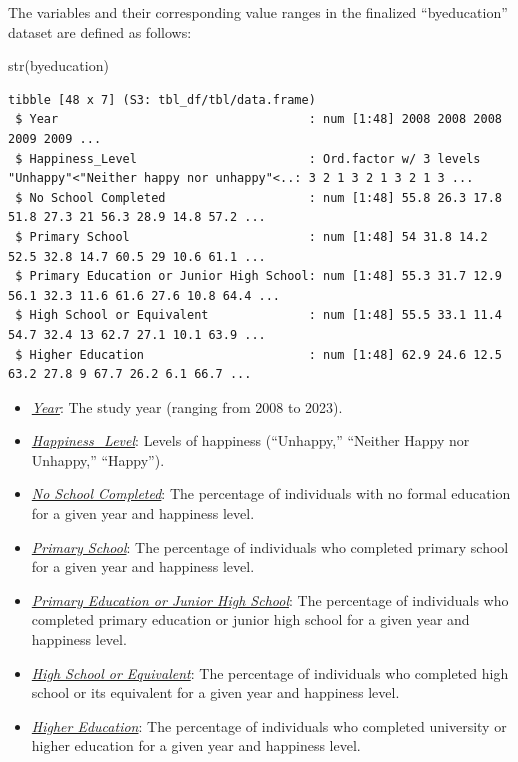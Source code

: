 \documentclass[
  11pt,
  a4paper,
  DIV=11,
  numbers=noendperiod]{scrartcl}
\newenvironment{Shaded}{\begin{snugshade}}{\end{snugshade}}
\newcommand{\FunctionTok}[1]{\textcolor[rgb]{0.28,0.35,0.67}{#1}}
\newcommand{\NormalTok}[1]{\textcolor[rgb]{0.00,0.23,0.31}{#1}}
\begin{document}
The variables and their corresponding value ranges in the finalized
``byeducation'' dataset are defined as follows:

\begin{Shaded}
\begin{Highlighting}[]
 \FunctionTok{str}\NormalTok{(byeducation)}
\end{Highlighting}
\end{Shaded}

\begin{verbatim}
tibble [48 x 7] (S3: tbl_df/tbl/data.frame)
 $ Year                                   : num [1:48] 2008 2008 2008 2009 2009 ...
 $ Happiness_Level                        : Ord.factor w/ 3 levels "Unhappy"<"Neither happy nor unhappy"<..: 3 2 1 3 2 1 3 2 1 3 ...
 $ No School Completed                    : num [1:48] 55.8 26.3 17.8 51.8 27.3 21 56.3 28.9 14.8 57.2 ...
 $ Primary School                         : num [1:48] 54 31.8 14.2 52.5 32.8 14.7 60.5 29 10.6 61.1 ...
 $ Primary Education or Junior High School: num [1:48] 55.3 31.7 12.9 56.1 32.3 11.6 61.6 27.6 10.8 64.4 ...
 $ High School or Equivalent              : num [1:48] 55.5 33.1 11.4 54.7 32.4 13 62.7 27.1 10.1 63.9 ...
 $ Higher Education                       : num [1:48] 62.9 24.6 12.5 63.2 27.8 9 67.7 26.2 6.1 66.7 ...
\end{verbatim}

\begin{itemize}
\item
  \ul{\emph{Year}}: The study year (ranging from 2008 to 2023).
\item
  \ul{\emph{Happiness\_Level}}: Levels of happiness (``Unhappy,''
  ``Neither Happy nor Unhappy,'' ``Happy'').
\item
  \ul{\emph{No School Completed}}: The percentage of individuals with no
  formal education for a given year and happiness level.
\item
  \ul{\emph{Primary School}}: The percentage of individuals who
  completed primary school for a given year and happiness level.
\item
  \ul{\emph{Primary Education or Junior High School}}: The percentage of
  individuals who completed primary education or junior high school for
  a given year and happiness level.
\item
  \ul{\emph{High School or Equivalent}}: The percentage of individuals
  who completed high school or its equivalent for a given year and
  happiness level.
\item
  \ul{\emph{Higher Education}}: The percentage of individuals who
  completed university or higher education for a given year and
  happiness level.
\end{itemize}
\end{document}
